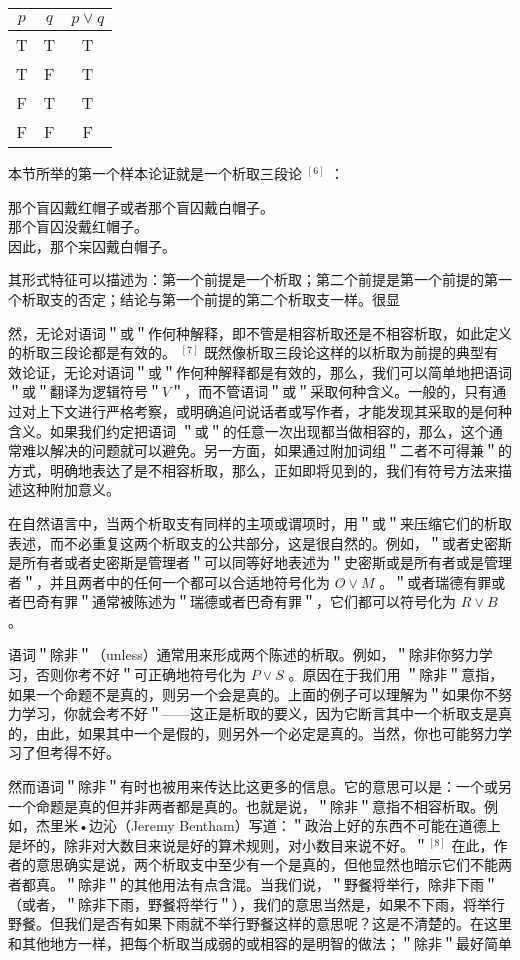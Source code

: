 \begin{center}
\begin{tabular}{|ccc|}
\hline
$p$ & $q$ & $p \vee q$ \\
\hline
T & T & T \\
T & F & T \\
F & T & T \\
F & F & F \\
\hline
\end{tabular}
\end{center}

本节所举的第一个样本论证就是一个析取三段论 ${ }^{[6]}$ ：

那个盲囚戴红帽子或者那个盲囚戴白帽子。\\
那个盲囚没戴红帽子。\\
因此，那个杗囚戴白帽子。

其形式特征可以描述为：第一个前提是一个析取；第二个前提是第一个前提的第一个析取支的否定；结论与第一个前提的第二个析取支一样。很显

然，无论对语词＂或＂作何种解释，即不管是相容析取还是不相容析取，如此定义的析取三段论都是有效的。 ${ }^{[7]}$ 既然像析取三段论这样的以析取为前提的典型有效论证，无论对语词＂或＂作何种解释都是有效的，那么，我们可以简单地把语词＂或＂翻译为逻辑符号＂$V$＂，而不管语词＂或＂采取何种含义。一般的，只有通过对上下文进行严格考察，或明确追问说话者或写作者，才能发现其采取的是何种含义。如果我们约定把语词 ＂或＂的任意一次出现都当做相容的，那么，这个通常难以解决的问题就可以避免。另一方面，如果通过附加词组＂二者不可得兼＂的方式，明确地表达了是不相容析取，那么，正如即将见到的，我们有符号方法来描述这种附加意义。

在自然语言中，当两个析取支有同样的主项或谓项时，用＂或＂来压缩它们的析取表述，而不必重复这两个析取支的公共部分，这是很自然的。例如，＂或者史密斯是所有者或者史密斯是管理者＂可以同等好地表述为＂史密斯或是所有者或是管理者＂，并且两者中的任何一个都可以合适地符号化为 $O \vee M$ 。＂或者瑞德有罪或者巴奇有罪＂通常被陈述为＂瑞德或者巴奇有罪＂，它们都可以符号化为 $R \vee B$ 。

语词＂除非＂（unless）通常用来形成两个陈述的析取。例如，＂除非你努力学习，否则你考不好＂可正确地符号化为 $P \vee S$ 。原因在于我们用 ＂除非＂意指，如果一个命题不是真的，则另一个会是真的。上面的例子可以理解为＂如果你不努力学习，你就会考不好＂——这正是析取的要义，因为它断言其中一个析取支是真的，由此，如果其中一个是假的，则另外一个必定是真的。当然，你也可能努力学习了但考得不好。

然而语词＂除非＂有时也被用来传达比这更多的信息。它的意思可以是：一个或另一个命题是真的但并非两者都是真的。也就是说，＂除非＂意指不相容析取。例如，杰里米•边沁（Jeremy Bentham）写道：＂政治上好的东西不可能在道德上是坏的，除非对大数目来说是好的算术规则，对小数目来说不好。＂${ }^{[8]}$ 在此，作者的意思确实是说，两个析取支中至少有一个是真的，但他显然也暗示它们不能两者都真。＂除非＂的其他用法有点含混。当我们说，＂野餐将举行，除非下雨＂（或者，＂除非下雨，野餐将举行＂），我们的意思当然是，如果不下雨，将举行野餐。但我们是否有如果下雨就不举行野餐这样的意思呢？这是不清楚的。在这里和其他地方一样，把每个析取当成弱的或相容的是明智的做法；＂除非＂最好简单

